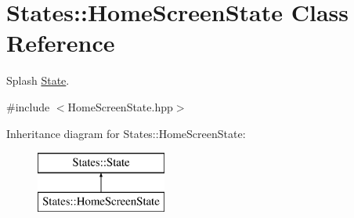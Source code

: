 \hypertarget{class_states_1_1_home_screen_state}{}\section{States\+::Home\+Screen\+State Class Reference}
\label{class_states_1_1_home_screen_state}


Splash \mbox{\hyperlink{class_states_1_1_state}{State}}.  




{\ttfamily \#include $<$Home\+Screen\+State.\+hpp$>$}

Inheritance diagram for States\+::Home\+Screen\+State\+:\begin{figure}[H]
\begin{center}
\leavevmode
\includegraphics[height=2.000000cm]{class_states_1_1_home_screen_state}
\end{center}
\end{figure}

